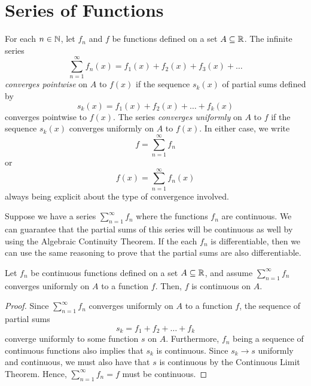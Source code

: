 \section{Series of Functions}

\begin{definition}
    For each \( n \in \mathbb{N}  \), let \( f_n  \) and \( f  \) be functions defined on a set \( A \subseteq \mathbb{R}  \). The infinite series 
    \[  \sum_{ n=1 }^{ \infty  } f_n(x) = f_1(x) + f_2(x) + f_3(x) + \dots \]
    \textit{converges pointwise}  on \( A  \) to \( f(x)  \) if the sequence \( s_k(x)  \) of partial sums defined by 
    \[  s_k(x) = f_1(x) + f_2(x) + \dots + f_k(x) \]
    converges pointwise to \( f(x)  \). The series \textit{converges uniformly} on \( A  \) to \( f  \) if the sequence \( s_k(x)  \) converges uniformly on \( A  \) to \( f(x)  \). In either case, we write 
    \[  f = \sum_{ n=1 }^{ \infty  } f_n  \] or 
    \[  f(x) = \sum_{ n=1 }^{ \infty  } f_n(x)  \] always being explicit about the type of convergence involved.
\end{definition}

Suppose we have a series \( \sum_{ n=1 }^{ \infty  }f_n  \) where the functions \( f_n  \) are continuous. We can guarantee that the partial sums of this series will be continuous as well by using the Algebraic Continuity Theorem. If the each \( f_n  \) is differentiable, then we can use the same reasoning to prove that the partial sums are also differentiable.

\begin{theorem}
    Let \( f_n  \) be continuous functions defined on a set \( A \subseteq \mathbb{R}  \), and assume \( \sum_{ n=1 }^{ \infty  } f_n  \) converges uniformly on \( A  \) to a function \( f  \). Then, \( f  \) is continuous on \( A  \).
    \end{theorem}

\begin{proof}
Since \( \sum_{ n=1 }^{ \infty  } f_n  \) converges uniformly on \( A  \) to a function \( f  \), the sequence of partial sums 
\[  s_k = f_1 + f_2 + \dots + f_k \]
converge uniformly to some function \( s  \) on \( A  \). Furthermore, \( f_n \) being a sequence of continuous functions also implies that \( s_k  \) is continuous. Since \( s_k \to s  \) uniformly and continuous, we must also have that \( s  \) is continuous by the Continuous Limit Theorem. Hence, \( \sum_{ n=1 }^{ \infty  } f_n = f  \) must be continuous.
\end{proof}

